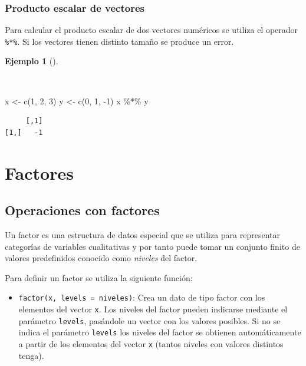 \documentclass[
  a4paper,
]{scrreport}
\newenvironment{Shaded}{\begin{snugshade}}{\end{snugshade}}
\newcommand{\DecValTok}[1]{\textcolor[rgb]{0.68,0.00,0.00}{#1}}
\newcommand{\FunctionTok}[1]{\textcolor[rgb]{0.28,0.35,0.67}{#1}}
\newcommand{\NormalTok}[1]{\textcolor[rgb]{0.00,0.23,0.31}{#1}}
\newcommand{\OtherTok}[1]{\textcolor[rgb]{0.00,0.23,0.31}{#1}}
\newcommand{\SpecialCharTok}[1]{\textcolor[rgb]{0.37,0.37,0.37}{#1}}
\providecommand{\tightlist}{%
  \setlength{\itemsep}{0pt}\setlength{\parskip}{0pt}}\usepackage{longtable,booktabs,array}
\theoremstyle{definition}
\theoremstyle{definition}
\newtheorem{example}{Ejemplo}[chapter]
\theoremstyle{remark}
\begin{document}
\hypertarget{producto-escalar-de-vectores}{%
\subsubsection{Producto escalar de
vectores}\label{producto-escalar-de-vectores}}

Para calcular el producto escalar de dos vectores numéricos se utiliza
el operador \texttt{\%*\%}. Si los vectores tienen distinto tamaño se
produce un error.

\begin{example}[]\protect\hypertarget{exm-producto-escalar}{}\label{exm-producto-escalar}

~

\begin{Shaded}
\begin{Highlighting}[]
\NormalTok{x }\OtherTok{\textless{}{-}} \FunctionTok{c}\NormalTok{(}\DecValTok{1}\NormalTok{, }\DecValTok{2}\NormalTok{, }\DecValTok{3}\NormalTok{)}
\NormalTok{y }\OtherTok{\textless{}{-}} \FunctionTok{c}\NormalTok{(}\DecValTok{0}\NormalTok{, }\DecValTok{1}\NormalTok{, }\SpecialCharTok{{-}}\DecValTok{1}\NormalTok{)}
\NormalTok{x }\SpecialCharTok{\%*\%}\NormalTok{ y}
\end{Highlighting}
\end{Shaded}

\begin{verbatim}
     [,1]
[1,]   -1
\end{verbatim}

\end{example}

\hypertarget{factores}{%
\section{Factores}\label{factores}}

\hypertarget{operaciones-con-factores}{%
\subsection{Operaciones con factores}\label{operaciones-con-factores}}

Un factor es una estructura de datos especial que se utiliza para
representar categorías de variables cualitativas y por tanto puede tomar
un conjunto finito de valores predefinidos conocido como \emph{niveles}
del factor.

Para definir un factor se utiliza la siguiente función:

\begin{itemize}
\tightlist
\item
  \texttt{factor(x,\ levels\ =\ niveles)}: Crea un dato de tipo factor
  con los elementos del vector \texttt{x}. Los niveles del factor pueden
  indicarse mediante el parámetro \texttt{levels}, pasándole un vector
  con los valores posibles. Si no se indica el parámetro \texttt{levels}
  los niveles del factor se obtienen automáticamente a partir de los
  elementos del vector \texttt{x} (tantos niveles con valores distintos
  tenga).
\end{itemize}
\end{document}
